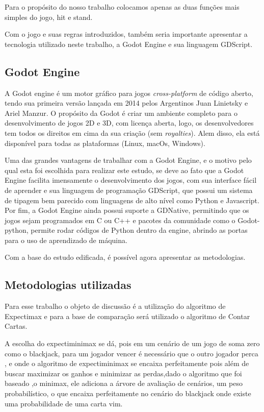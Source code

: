     Para o propósito do nosso trabalho colocamos apenas as duas funções 
    mais simples do jogo, hit e stand. 

    Com o jogo e suas regras introduzidos, também seria importante apresentar a 
    tecnologia utilizado neste trabalho, a Godot Engine e sua linguagem GDScript.

\subsection{Godot Engine}

    A Godot engine\cite{GodotEngine} é um motor gráfico para jogos \textit{cross-platform} de 
    código aberto, tendo sua primeira versão lançada em 2014 pelos Argentinos 
    Juan Linietsky e Ariel Manzur. O propósito da Godot é criar um ambiente 
    completo para o desenvolvimento de jogos 2D e 3D, com licença aberta, logo, 
    os desenvolvedores tem todos os direitos em cima da sua criação (sem \textit{royalties}). 
    Alem disso, ela está disponível para todas as plataformas (Linux, macOs, Windows).

    Uma das grandes vantagens de trabalhar com a Godot Engine, e o motivo pelo qual esta
    foi escolhida para realizar este estudo, se deve ao fato que a Godot Engine facilita imensamente 
    o desenvolvimento dos jogos, com sua interface fácil de aprender e sua linguagem de programação
    GDScript, que possui um sistema de tipagem bem parecido com linguagens de alto nível 
    como Python e Javascript. Por fim, a Godot Engine ainda possui suporte a GDNative, permitindo 
    que os jogos sejam programados em C ou C++ e pacotes da comunidade como o Godot-python\cite{GodotPython}, permite 
    rodar códigos de Python dentro da engine, abrindo as portas para o uso de aprendizado de máquina.

    Com a base do estudo edificada, é possível agora apresentar as metodologias.

\subsection{Metodologias utilizadas}

    Para esse trabalho o objeto de discussão é a utilização do algoritmo de Expectimax
    e para a base de comparação será utilizado o algoritmo de Contar Cartas. 

    A escolha do expectiminimax se dá, pois em um cenário de um jogo de soma zero como o blackjack, 
    para um jogador vencer é necessário que o outro jogador perca , e onde o algoritmo de expectiminimax 
    se encaixa perfeitamente pois além de buscar maximizar os ganhos e minimizar as perdas,dado o algoritmo 
    que foi baseado ,o minimax, ele adiciona a árvore de avaliação de cenários, um peso probabilístico, o 
    que encaixa perfeitamente no cenário do blackjack onde existe uma probabilidade de uma carta vim. 

